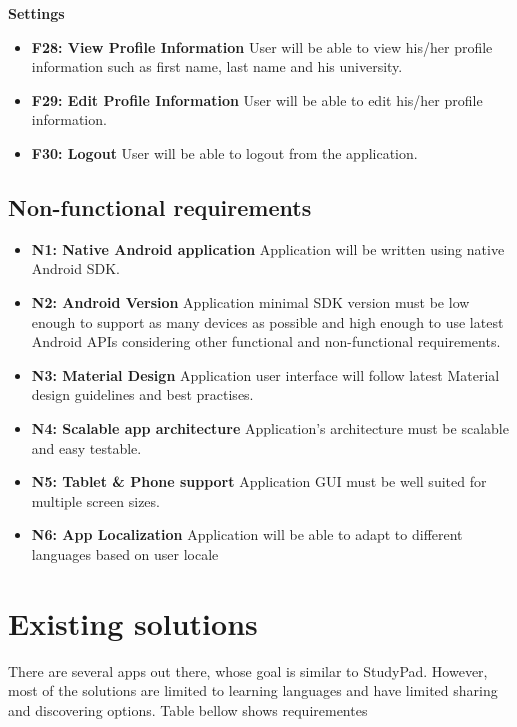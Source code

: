 \documentclass[thesis=B,english]{FITthesis}[2012/10/20]
\newcommand{\appname}{StudyPad}
\begin{document}
\bigskip
\textbf{Settings}
\begin{itemize}
	\item \textbf{F28: View Profile Information} User will be able to view his/her profile information such as first name, last name and his university.
	\item \textbf{F29: Edit Profile Information} User will be able to edit his/her profile information.
	\item \textbf{F30: Logout} User will be able to logout from the application.
\end{itemize}


\subsection{Non-functional requirements}

\begin{itemize}
  \item \textbf{N1: Native Android application}  Application will be written using native Android SDK.
  \item \textbf{N2: Android Version} Application minimal SDK version must be low enough to support as many devices as possible and high enough to use latest Android APIs considering other functional and non-functional requirements.
  \item \textbf{N3: Material Design} Application user interface will follow latest Material design guidelines and best practises.
  \item \textbf{N4: Scalable app architecture} Application's architecture must be scalable and easy testable.
  \item \textbf{N5: Tablet \& Phone support} Application GUI must be well suited for multiple screen sizes.
  \item \textbf{N6: App Localization} Application will be able to adapt to different languages based on user locale
\end{itemize}


\newpage

\section{Existing solutions}

There are several apps out there, whose goal is similar to \appname. However, most of the solutions are limited to learning languages and have limited sharing and discovering options. Table bellow shows requirementes
\end{document}
